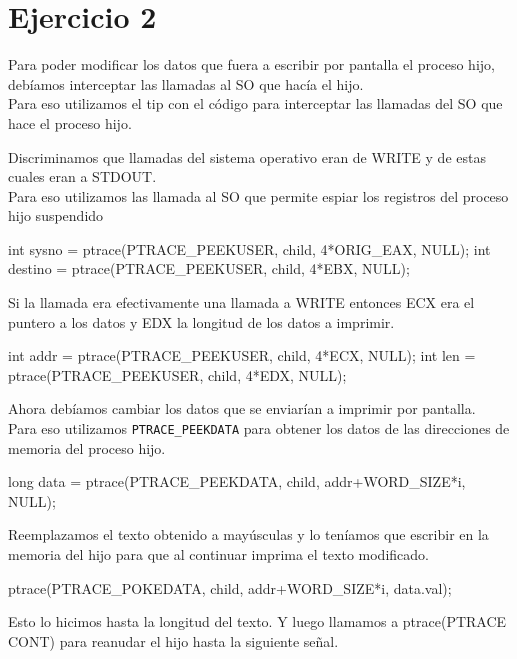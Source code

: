 \newpage

\section{Ejercicio 2}

Para poder modificar los datos que fuera a escribir por pantalla el proceso hijo, deb\'iamos interceptar las llamadas al SO que hac\'ia el hijo.\\
Para eso utilizamos el tip con el c\'odigo para interceptar las llamadas del SO que hace el proceso hijo.


Discriminamos que llamadas del sistema operativo eran de WRITE y de estas cuales eran a STDOUT.\\
Para eso utilizamos las llamada al SO que permite espiar los registros del proceso hijo suspendido

\begin{framed}
\begin{verbatimtab}
int sysno = ptrace(PTRACE_PEEKUSER, child, 4*ORIG_EAX, NULL);
int destino = ptrace(PTRACE_PEEKUSER, child, 4*EBX, NULL);
\end{verbatimtab}
\end{framed}

Si la llamada era efectivamente una llamada a WRITE entonces ECX era el puntero a los datos y EDX la longitud de los datos a imprimir.

\begin{framed}
\begin{verbatimtab}
int addr = ptrace(PTRACE_PEEKUSER, child, 4*ECX, NULL);
int len = ptrace(PTRACE_PEEKUSER, child, 4*EDX, NULL);	
\end{verbatimtab}
\end{framed}

Ahora deb\'iamos cambiar los datos que se enviar\'ian a imprimir por pantalla.\\
Para eso utilizamos \verb|PTRACE_PEEKDATA| para obtener los datos de las direcciones de memoria del proceso hijo.

\begin{framed}
\begin{verbatimtab}
long data = ptrace(PTRACE_PEEKDATA, child, addr+WORD_SIZE*i, NULL);
\end{verbatimtab}
\end{framed}

Reemplazamos el texto obtenido a may\'usculas y lo ten\'iamos que escribir en la memoria del hijo para que al continuar imprima el texto modificado.

\begin{framed}
\begin{verbatimtab}
ptrace(PTRACE_POKEDATA, child, addr+WORD_SIZE*i, data.val);
\end{verbatimtab}
\end{framed}

Esto lo hicimos hasta la longitud del texto. Y luego llamamos a ptrace(PTRACE CONT) para reanudar el hijo hasta la siguiente se\~nal.
